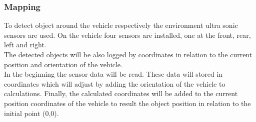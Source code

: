 \newpage

\subsubsection{Mapping}

To detect object around the vehicle respectively the environment ultra sonic sensors are used. On the vehicle four sensors are installed, one at the front, rear, left and right.\\
The detected objects will be also logged by coordinates in relation to the current position and orientation of the vehicle.\\
In the beginning the sensor data will be read. These data will stored in coordinates which will adjust by adding the orientation of the vehicle to calculations. Finally, the calculated coordinates will be added to the current position coordinates of the vehicle to result the object position in relation to the initial point (0,0).

